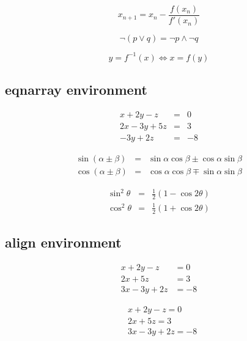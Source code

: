 \documentclass{article}
\begin{document}
\begin{equation}
	x_{n+1} = x_n-\frac{f(x_n)}{f'(x_n)} \nonumber
\end{equation}

\begin{equation}
	\lnot (p \lor q) = \lnot p \land \lnot q  \nonumber
\end{equation}

\begin{equation}
	y = f^{-1}(x)\Leftrightarrow x=f(y)
\end{equation}


\subsection{eqnarray environment}


\begin{eqnarray} %
	x + 2y -z &=&0\\
	2x-3y+5z &=&3\\
	-3y+2z &=&-8
\end{eqnarray}

\begin{eqnarray*}
	\sin(\alpha\pm\beta) &=& \sin\alpha\cos\beta \pm \cos\alpha\sin\beta\\
	\cos(\alpha\pm\beta) &=& \cos\alpha\cos\beta \mp \sin\alpha\sin\beta
\end{eqnarray*}

\begin{eqnarray}
	\sin^2 \theta &=& \frac{1}{2}(1-\cos 2\theta) \nonumber\\
	\cos^2\theta &=& \frac{1}{2}(1+\cos 2\theta)
\end{eqnarray}


\subsection{align environment}

\begin{align} %
	x + 2y -z &=0\\
	2x+5z &=3 \\
	3x-3y+2z &=-8
\end{align}

\begin{align} %
	&x + 2y -z =0 \nonumber \\
	&2x+5z =3 \\
	&3x-3y+2z =-8
\end{align}
\end{document}
